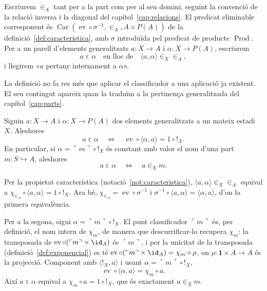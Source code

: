 \begin{notacio}\label{not:pertinenca-interna}
Escriurem \(\in_A\) tant per a la part com per al seu domini, seguint la
convenció de la relació inversa i la diagonal del
capítol~\ref{cap:relacions}. El predicat eliminable corresponent és
\(\operatorname{Car}(\operatorname{ev}\circ\sigma^{-1},{\in_A},A\times
P(A))\) de la definició~\ref{def:caracteristica}, amb \(\sigma\)
introduïda pel predicat de producte \(\operatorname{Prod}\). Per a un
parell d'elements generalitzats \(a\colon X\to A\) i \(\alpha\colon X\to
P(A)\), escriurem
\[
a\mathrel{\varepsilon}\alpha
\quad\text{en lloc de}\quad
\langle a,\alpha\rangle\in_X{\in_A},
\]
i llegirem «\(a\) pertany internament a \(\alpha\)».
\end{notacio}

La definició no fa res més que aplicar el classificador a una aplicació ja
existent. El seu contingut apareix quan la traduïm a la pertinença
generalitzada del capítol~\ref{cap:parts}.

\begin{proposicio}\label{prop:pertinenca-interna-lectura}
Siguin \(a\colon X\to A\) i \(\alpha\colon X\to P(A)\) dos elements
generalitzats a un mateix estadi \(X\). Aleshores
\[
a\mathrel{\varepsilon}\alpha
\quad\Longleftrightarrow\quad
\operatorname{ev}\circ\langle\alpha,a\rangle=1\circ{!}_X .
\]
En particular, si \(\alpha=\ulcorner m\urcorner\circ{!}_X\) és constant amb
valor el nom d'una part \(m\colon S\hookrightarrow A\), aleshores
\[
a\mathrel{\varepsilon}\alpha
\quad\Longleftrightarrow\quad
a\in_X m .
\]
\end{proposicio}

\begin{prova}
Per la propietat característica (notació~\ref{not:caracteristica}),
\(\langle a,\alpha\rangle\in_X{\in_A}\) equival a
\(\chi_{\in_A}\circ\langle a,\alpha\rangle=1\circ{!}_X\). Ara bé,
\(\chi_{\in_A}=\operatorname{ev}\circ\sigma^{-1}\) i
\(\sigma^{-1}\circ\langle a,\alpha\rangle=\langle\alpha,a\rangle\), d'on
la primera equivalència.

Per a la segona, sigui \(\alpha=\ulcorner m\urcorner\circ{!}_X\). El punt
classificador \(\ulcorner m\urcorner\) és, per definició, el nom intern de
\(\chi_m\), de manera que descurrificar-lo recupera \(\chi_m\): la
transposada de \(\operatorname{ev}\circ(\ulcorner m\urcorner\times\id_A)\)
és \(\ulcorner m\urcorner\), i per la unicitat de la transposada
(definició~\ref{def:exponencial}) es té
\(\operatorname{ev}\circ(\ulcorner m\urcorner\times\id_A)=\chi_m\circ\rho\),
on \(\rho\colon\mathbf1\times A\to A\) és la projecció. Component amb
\(\langle{!}_X,a\rangle\) i usant \(\alpha=\ulcorner m\urcorner\circ{!}_X\),
\[
\operatorname{ev}\circ\langle\alpha,a\rangle
=\chi_m\circ a .
\]
Així \(a\mathrel{\varepsilon}\alpha\) equival a
\(\chi_m\circ a=1\circ{!}_X\), que és exactament \(a\in_X m\).
\end{prova}

